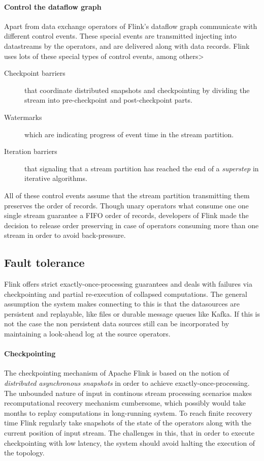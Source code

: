 \paragraph{Control the dataflow graph}
Apart from data exchange operators of Flink's dataflow graph communicate with different control events. These special events are transmitted injecting into datastreams by the operators, and are delivered along with data records. Flink uses lots of these special types of control events, among others>
\begin{description}
\item[Checkpoint barriers]that coordinate distributed snapshots and checkpointing by dividing the stream into pre-checkpoint and post-checkpoint parts.
\item[Watermarks] which are indicating progress of event time in the stream partition.
\item[Iteration barriers] that signaling that a stream partition  has reached the end of a \textit{superstep} in iterative algorithms.
\end{description}

All of these control events assume that the stream partition transmitting them preserves  the order of records.  Though unary operators what consume one  
one single stream guarantee  a FIFO order of records, developers of Flink made the decision to release order preserving in case of operators consuming more than one stream in order to avoid back-pressure.

\subsection{Fault tolerance}\label{flinkft}

Flink offers strict  exactly-once-processing guarantees and deals with failures  via checkpointing and partial re-execution of collapsed computations. The general assumption the system makes connecting to this is that the datasources are persistent and replayable, like files or durable message queues like Kafka. If this is not the case the non persistent data sources still can be incorporated by maintaining a look-ahead log at the source operators.

\paragraph{Checkpointing}
The checkpointing mechanism of Apache Flink is based on the notion of \textit{distributed asynchronous snapshots} in order to achieve exactly-once-processing. The unbounded nature of input in continous stream processing scenarios makes recomputational recovery mechanism cumbersome, which possibly would take months to replay computations in long-running system. 
To reach finite recovery time Flink regularly take snapshots of the state of the operators along with the current position of input stream. The challenges in this, that in order to execute checkpointing with low latency, the system should avoid halting the execution of the topology. 

